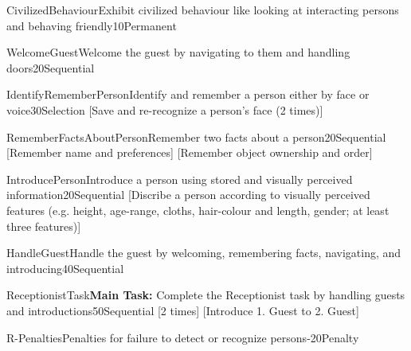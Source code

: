 
\begin{Group}{CivilizedBehaviour}{Exhibit civilized behaviour like looking at interacting persons and behaving friendly}{10}{Permanent}
\end{Group}

\begin{Group}{WelcomeGuest}{Welcome the guest by navigating to them and handling doors}{20}{Sequential}
\end{Group}

\begin{Group}{IdentifyRememberPerson}{Identify and remember a person either by face or voice}{30}{Selection}
    [Save and re-recognize a person’s face (2 times)] 
\end{Group}

\begin{Group}{RememberFactsAboutPerson}{Remember two facts about a person}{20}{Sequential}
    [Remember name and preferences]
    [Remember object ownership and order]
\end{Group}

\begin{Group}{IntroducePerson}{Introduce a person using stored and visually perceived information}{20}{Sequential}
    [Discribe a person according to visually perceived features (e.g. height, age-range, cloths, hair-colour and length, gender; at least three features)]
\end{Group}

\begin{Group}{HandleGuest}{Handle the guest by welcoming, remembering facts, navigating, and introducing}{40}{Sequential}
\end{Group}

\begin{Group}{ReceptionistTask}{\textbf{\textcolor{myturquoise}{Main Task:}} Complete the Receptionist task by handling guests and introductions}{50}{Sequential}
    [2 times]
    [Introduce 1. Guest to 2. Guest]
\end{Group}

\begin{Group}{R-Penalties}{Penalties for failure to detect or recognize persons}{-20}{Penalty}
\end{Group}
